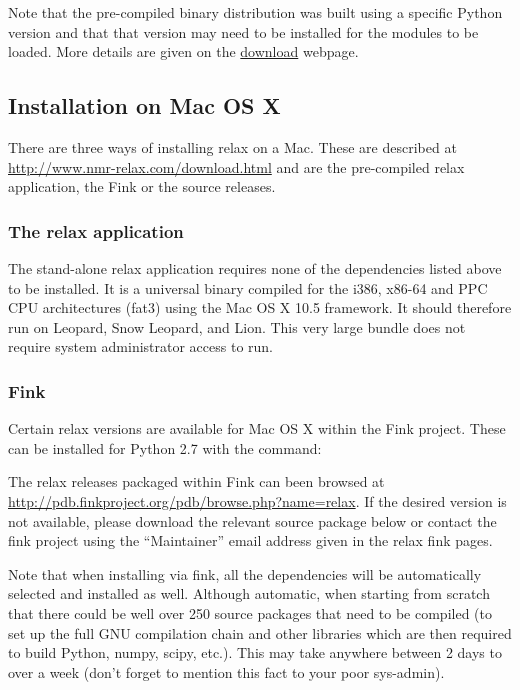 

Note that the pre-compiled binary distribution was built using a specific Python version and that that version may need to be installed for the modules to be loaded.  More details are given on the \href{http://www.nmr-relax.com/download.html}{download} webpage.


\subsection{Installation on Mac OS X}

There are three ways of installing relax on a Mac.  These are described at \href{http://www.nmr-relax.com/download.html}{http://www.nmr-relax.com/download.html} and are the pre-compiled relax application, the Fink or the source releases.

\subsubsection{The relax application}

The stand-alone relax application requires none of the dependencies listed above to be installed.  It is a universal binary compiled for the i386, x86-64 and PPC CPU architectures (fat3) using the Mac OS X 10.5 framework.  It should therefore run on Leopard, Snow Leopard, and Lion.  This very large bundle does not require system administrator access to run.

\subsubsection{Fink}

Certain relax versions are available for Mac OS X within the Fink project.  These can be installed for Python 2.7 with the command:


The relax releases packaged within Fink can been browsed at \href{http://pdb.finkproject.org/pdb/browse.php?name=relax}{http://pdb.finkproject.org/pdb/browse.php?name=relax}. If the desired version is not available, please download the relevant source package below or contact the fink project using the ``Maintainer'' email address given in the relax fink pages.

Note that when installing via fink, all the dependencies will be automatically selected and installed as well.  Although automatic, when starting from scratch that there could be well over 250 source packages that need to be compiled (to set up the full GNU compilation chain and other libraries which are then required to build Python, numpy, scipy, etc.).  This may take anywhere between 2 days to over a week (don't forget to mention this fact to your poor sys-admin).

